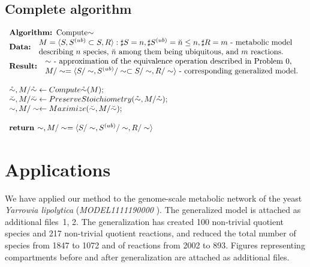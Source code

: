 \documentclass[9pt]{article}
\begin{document}
\subsection*{Complete algorithm}
\[ \begin{array}{l}
\mbox{\textbf{Algorithm: }Compute${\sim}$}\\
\mbox{\textbf{Data: }}\begin{array}{l}\mbox{$M=\langle{S, S^{(ub)}\subset{S}, R}\rangle: \sharp S = n, \sharp S^{(ub)}=\breve{n} \leq n, \sharp R = m$ - metabolic model}\\ \mbox{describing $n$ species,  $\breve{n}$ among them being ubiquitous,  and $m$ reactions.}\end{array}\\
\mbox{\textbf{Result: }}\begin{array}{l}\mbox{$\sim$ - approximation of the equivalence operation described in Problem~0,}\\ \mbox{$M/\sim = \langle S/\sim, S^{(ub)}/\sim \subset S/\sim, R/\sim \rangle$ - corresponding generalized model.}\end{array}\\
\mbox{~}\\
\mbox{$\mathring{\sim}, M/\mathring{\sim} \leftarrow Compute\mathring{\sim}(M);$} \\
\mbox{$\breve{\sim}, M/\breve{\sim} \leftarrow PreserveStoichiometry(\mathring{\sim}, M/{\mathring{\sim}});$} \\
\mbox{$\sim, M/\sim \leftarrow Maximize(\breve{\sim}, M/\breve{\sim});$} \\
\mbox{~}\\
\mbox{\textbf{return }$\sim, M/\sim = \langle S/\sim, S^{(ub)}/\sim, R/\sim \rangle$}
\end{array} \]

\newpage
\section*{Applications}
We have applied our method to the genome-scale metabolic network of the yeast \textit{Yarrowia lipolytica} (\emph{MODEL1111190000} \citep{Loira12}). The generalized model is attached as additional files~1, 2. The generalization has created 100 non-trivial quotient species and 217 non-trivial quotient reactions, and reduced  the total number of species from 1847 to 1072 and of reactions from 2002 to 893. Figures representing compartments before and after generalization are attached as additional files. 
\end{document}
